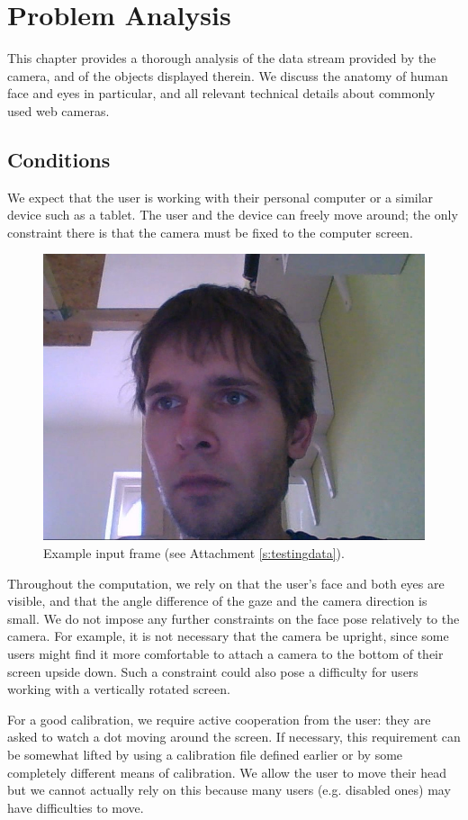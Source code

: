 \chapter{Problem Analysis}
\label{s:analy}
This chapter provides a thorough analysis of the data stream provided by the camera, and of the objects displayed therein.
We discuss the anatomy of human face and eyes in particular, and all relevant technical details about commonly used web cameras.

\section{Conditions}

We expect that the user is working with their personal computer or a similar device such as a tablet.
The user and the device can freely move around; the only constraint there is that the camera must be fixed to the computer screen.

\begin{figure}[h]
	\centering 
	\centering \includegraphics[width=0.7\linewidth]{img/analy-shot.jpg}
	\caption{Example input frame (see Attachment \ref{s:testingdata}).}\label{i:analy-shot}
\end{figure}

Throughout the computation, we rely on that the user's face and both eyes are visible, and that the angle difference of the gaze and the camera direction is small.
We do not impose any further constraints on the face pose relatively to the camera.
For example, it is not necessary that the camera be upright, since some users might find it more comfortable to attach a camera to the bottom of their screen upside down.
Such a constraint could also pose a difficulty for users working with a vertically rotated screen.

For a good calibration, we require active cooperation from the user: they are asked to watch a dot moving around the screen.
If necessary, this requirement can be somewhat lifted by using a calibration file defined earlier or by some completely different means of calibration.
We allow the user to move their head but we cannot actually rely on this because many users (e.g. disabled ones) may have difficulties to move.

